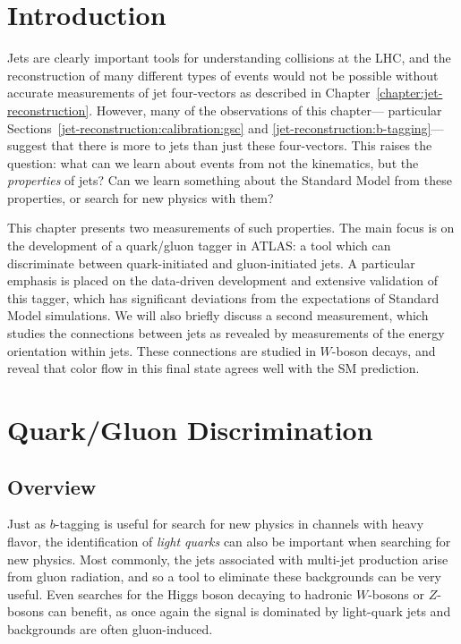 \label{chapter:color}
\section{Introduction}

Jets are clearly important tools for understanding collisions at the LHC, and the reconstruction of many different types of events would not be possible without accurate measurements of jet four-vectors as described in Chapter~\ref{chapter:jet-reconstruction}. However, many of the observations of this chapter--- particular Sections~\ref{jet-reconstruction:calibration:gsc} and \ref{jet-reconstruction:b-tagging}--- suggest that there is more to jets than just these four-vectors. This raises the question: what can we learn about events from not the kinematics, but the \textit{properties} of jets? Can we learn something about the Standard Model from these properties, or search for new physics with them?

This chapter presents two measurements of such properties. The main focus is on the development of a quark/gluon tagger in ATLAS: a tool which can discriminate between quark-initiated and gluon-initiated jets. A particular emphasis is placed on the data-driven development and extensive validation of this tagger, which has significant deviations from the expectations of  Standard Model simulations. We will also briefly discuss a second measurement, which studies the connections between jets as revealed by measurements of the energy orientation within jets. These connections are studied in $W$-boson decays, and reveal that color flow in this final state agrees well with the SM prediction.

\section{Quark/Gluon Discrimination}
\label{jet-reconstruction:qg}
\subsection{Overview}
\label{jet-reconstruction:qg:overview}

Just as $b$-tagging is useful for search for new physics in channels with heavy flavor, the identification of \textit{light quarks} can also be important when searching for new physics. Most commonly, the jets associated with multi-jet production arise from gluon radiation, and so a tool to eliminate these backgrounds can be very useful. Even searches for the Higgs boson decaying to hadronic $W$-bosons or $Z$-bosons can benefit, as once again the signal is dominated by light-quark jets and backgrounds are often gluon-induced.


